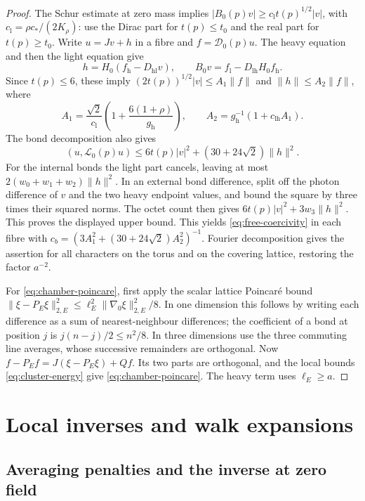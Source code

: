 \begin{proof}
The Schur estimate at zero mass implies
$|B_0(p)v|\ge c_{\mathrm l}t(p)^{1/2}|v|$, with
$c_{\mathrm l}=\rho c_*/(2K_\rho)$: use the Dirac part for
$t(p)\le t_0$ and the real part for $t(p)\ge t_0$.
Write $u=Jv+h$ in a fibre and $f=\mathcal D_0(p)u$. The heavy equation
and then the light equation give
\[
 h=H_0(f_{\mathrm h}-D_{\mathrm{hl}}v),\qquad
 B_0v=f_{\mathrm l}-D_{\mathrm{lh}}H_0f_{\mathrm h}.
\]
Since $t(p)\le6$, these imply
$(2t(p))^{1/2}|v|\le A_1\|f\|$ and $\|h\|\le A_2\|f\|$, where
\[
 A_1=\frac{\sqrt2}{c_{\mathrm l}}
         \left(1+\frac{6(1+\rho)}{g_{\mathrm h}}\right),\qquad
 A_2=g_{\mathrm h}^{-1}(1+c_{\mathrm{lh}}A_1).
\]
The bond decomposition also gives
\[
 (u,\mathcal L_0(p)u)\le6t(p)|v|^2+(30+24\sqrt2)\|h\|^2.
\]
For the internal bonds the light part cancels, leaving at most
$2(w_0+w_1+w_2)\|h\|^2$. In an external bond difference, split off
the photon difference of $v$ and the two heavy endpoint values, and
bound the square by three times their squared norms. The octet count
then gives $6t(p)|v|^2+3w_3\|h\|^2$. This proves the displayed
upper bound.
This yields \eqref{eq:free-coercivity} in each fibre with
$c_b=(3A_1^2+(30+24\sqrt2)A_2^2)^{-1}$.
Fourier decomposition gives the assertion for all characters on the
torus and on the covering lattice, restoring the factor $a^{-2}$.

For \eqref{eq:chamber-poincare}, first apply the scalar lattice
Poincar\'e bound
$\|\xi-P_E\xi\|_{2,E}^2\le\ell_E^2\|\nabla_0\xi\|_{2,E}^2/8$.
In one dimension this follows by writing each difference as a sum of
nearest-neighbour differences; the coefficient of a bond at position
$j$ is $j(n-j)/2\le n^2/8$. In three dimensions use the three commuting
line averages, whose successive remainders are orthogonal.
Now $f-P_Ef=J(\xi-P_E\xi)+Qf$. Its two parts are orthogonal, and the
local bounds \eqref{eq:cluster-energy} give
\eqref{eq:chamber-poincare}. The heavy term uses $\ell_E\ge a$.
\end{proof}

\section{Local inverses and walk expansions}\label{sec:local-walks}

\subsection{Averaging penalties and the inverse at zero field}
\label{subsec:blocked-zero-inverse}

